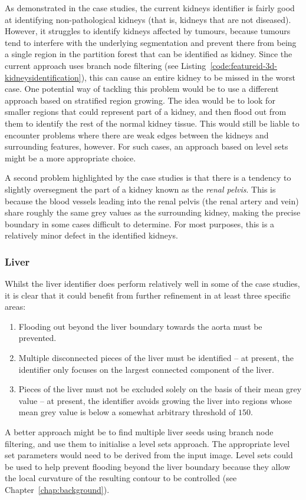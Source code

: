 As demonstrated in the case studies, the current kidneys identifier is fairly good at identifying non-pathological kidneys (that is, kidneys that are not diseased). However, it struggles to identify kidneys affected by tumours, because tumours tend to interfere with the underlying segmentation and prevent there from being a single region in the partition forest that can be identified as kidney. Since the current approach uses branch node filtering (see Listing~\ref{code:featureid-3d-kidneysidentification}), this can cause an entire kidney to be missed in the worst case. One potential way of tackling this problem would be to use a different approach based on stratified region growing. The idea would be to look for smaller regions that could represent part of a kidney, and then flood out from them to identify the rest of the normal kidney tissue. This would still be liable to encounter problems where there are weak edges between the kidneys and surrounding features, however. For such cases, an approach based on level sets might be a more appropriate choice.

A second problem highlighted by the case studies is that there is a tendency to slightly oversegment the part of a kidney known as the \emph{renal pelvis}. This is because the blood vessels leading into the renal pelvis (the renal artery and vein) share roughly the same grey values as the surrounding kidney, making the precise boundary in some cases difficult to determine. For most purposes, this is a relatively minor defect in the identified kidneys.

\subsubsection{Liver}

Whilst the liver identifier does perform relatively well in some of the case studies, it is clear that it could benefit from further refinement in at least three specific areas:
%
\begin{enumerate}

\item Flooding out beyond the liver boundary towards the aorta must be prevented.
\item Multiple disconnected pieces of the liver must be identified -- at present, the identifier only focuses on the largest connected component of the liver.
\item Pieces of the liver must not be excluded solely on the basis of their mean grey value -- at present, the identifier avoids growing the liver into regions whose mean grey value is below a somewhat arbitrary threshold of $150$.

\end{enumerate}
%
A better approach might be to find multiple liver seeds using branch node filtering, and use them to initialise a level sets approach. The appropriate level set parameters would need to be derived from the input image. Level sets could be used to help prevent flooding beyond the liver boundary because they allow the local curvature of the resulting contour to be controlled (see Chapter~\ref{chap:background}).

